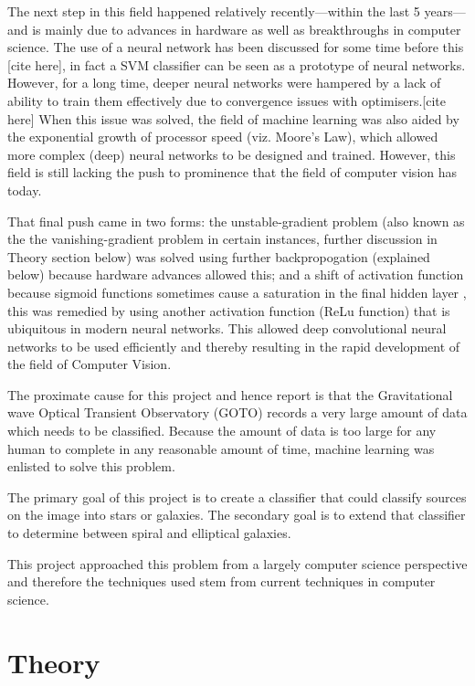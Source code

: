 \documentclass[a4paper,fleqn,usenatbib]{mnras}
\begin{document}
The next step in this field happened relatively recently---within the last 5 years---and is mainly due to advances in hardware as well as breakthroughs in computer science. The use of a neural network has been discussed for some time before this [cite here], in fact a SVM classifier can be seen as a prototype of neural networks. However, for a long time, deeper neural networks were hampered by a lack of ability to train them effectively due to convergence issues with optimisers.[cite here] When this issue was solved, the field of machine learning was also aided by the exponential growth of processor speed (viz. Moore's Law), which allowed more complex (deep) neural networks to be designed and trained. However, this field is still lacking the push to prominence that the field of computer vision has today. 

That final push came in two forms: the unstable-gradient problem (also known as the the vanishing-gradient problem in certain instances, further discussion in Theory section below) was solved using further backpropogation (explained below) because hardware advances allowed this; and a shift of activation function because sigmoid functions sometimes cause a saturation in the final hidden layer \cite{ReLu}, this was remedied by using another activation function (ReLu function) that is ubiquitous in modern neural networks. This allowed deep convolutional neural networks to be used efficiently and thereby resulting in the rapid development of the field of Computer Vision. \cite{NeuralNetworksandDeepLearning}

The proximate cause for this project and hence report is that the Gravitational wave Optical Transient Observatory (GOTO) records a very large amount of data which needs to be classified. Because the amount of data is too large for any human to complete in any reasonable amount of time, machine learning was enlisted to solve this problem. 

The primary goal of this project is to create a classifier that could classify sources on the image into stars or galaxies. The secondary goal is to extend that classifier to determine between spiral and elliptical galaxies. 

This project approached this problem from a largely computer science perspective and therefore the techniques used stem from current techniques in computer science. 

\section{Theory}
\end{document}
